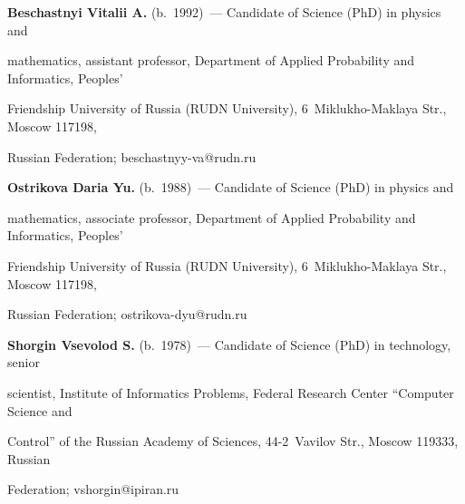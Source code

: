   


  \Contr


  


  \noindent


  \textbf{Beschastnyi Vitalii A.} (b.\ 1992)~--- Candidate of Science (PhD) in physics and 


mathematics, assistant professor, Department of Applied Probability and Informatics, Peoples' 


Friendship University of Russia (RUDN University), 6~Miklukho-Maklaya Str., Moscow 117198, 


Russian Federation; \mbox{beschastnyy-va@rudn.ru}


  


  \vspace*{3pt}


  


  \noindent


  \textbf{Ostrikova Daria Yu.} (b.\ 1988)~--- Candidate of Science (PhD) in physics and 


mathematics, associate professor, Department of Applied Probability and Informatics, Peoples' 


Friendship University of Russia (RUDN University), 6~Miklukho-Maklaya Str., Moscow 117198, 


Russian Federation; \mbox{ostrikova-dyu@rudn.ru}


  


  \vspace*{3pt}


  


  \noindent


  \textbf{Shorgin Vsevolod S.} (b.\ 1978)~--- Candidate of Science (PhD) in technology, senior 


scientist, Institute of Informatics Problems, Federal Research Center ``Computer Science and 


Control'' of the Russian Academy of Sciences, 44-2~Vavilov Str., Moscow 119333, Russian 


Federation; \mbox{vshorgin@ipiran.ru}


  


  \vspace*{3pt}


  


